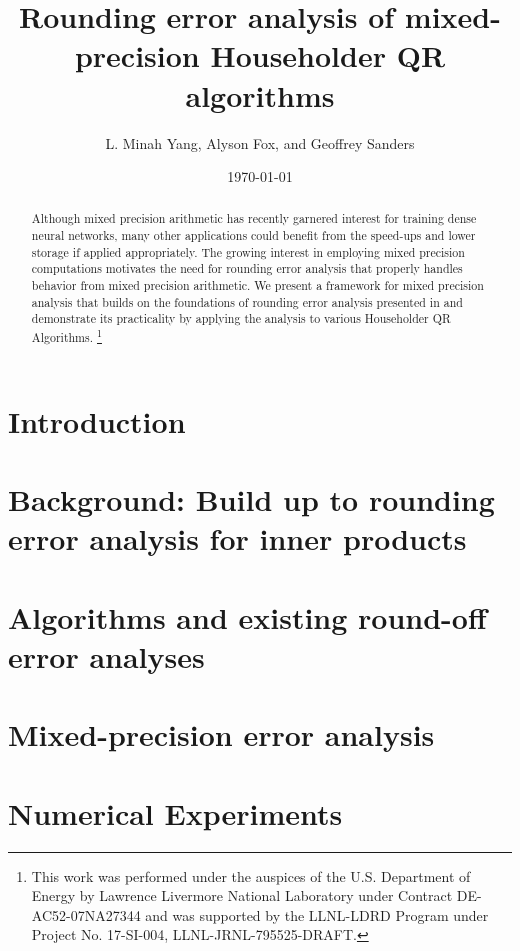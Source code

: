 \documentclass[review,onefignum,onetabnum]{siamart190516}
\title{Rounding error analysis of mixed-precision Householder QR algorithms}
\author{L. Minah Yang, Alyson Fox, and Geoffrey Sanders}
\date{\today}
\newcommand\blfootnote[1]{%
	\begingroup
	\renewcommand\thefootnote{}\footnote{#1}%
	\addtocounter{footnote}{-1}%
	\endgroup
}
\begin{document}
\maketitle
\begin{abstract}
	Although mixed precision arithmetic has recently garnered interest for training dense neural networks, many other applications could benefit from the  speed-ups and lower storage if applied appropriately. 
	The growing interest in employing mixed precision computations motivates the need for rounding error analysis that properly handles behavior from mixed precision arithmetic.
	We present a framework for mixed precision analysis that builds on the foundations of rounding error analysis presented in \cite{Higham2002} and demonstrate its practicality by applying the analysis to various Householder QR Algorithms. 
	\blfootnote{This work was performed under the auspices of the U.S. Department of Energy by Lawrence Livermore National Laboratory under Contract DE-AC52-07NA27344 and was supported by the LLNL-LDRD Program under Project No. 17-SI-004, LLNL-JRNL-795525-DRAFT.}
\end{abstract}
\section{Introduction}\label{sec:intro}

\section{Background: Build up to rounding error analysis for inner products}\label{sec:background}

\section{Algorithms and existing round-off error analyses}\label{sec:algo}

\section{Mixed-precision error analysis}\label{sec:mpanalysis}

\section{Numerical Experiments}\label{sec:NE}

%
%
%
%
%
\end{document}
